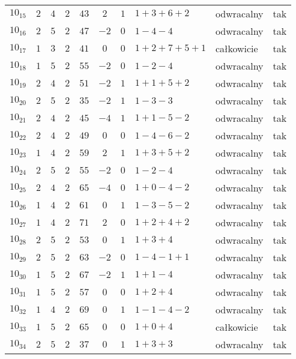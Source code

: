 \begin{longtable}{lccccccllc}
$10_{15}$  & $2$   & $4$ & $2$ & $43$  & $2$  & $1$ & $1+3+6+2$     & odwracalny & tak \\
$10_{16}$  & $2$   & $5$ & $2$ & $47$  & $-2$ & $0$ & $1-4-4$       & odwracalny & tak \\
$10_{17}$  & $1$   & $3$ & $2$ & $41$  & $0$  & $0$ & $1+2+7+5+1$   & całkowicie & tak \\
$10_{18}$  & $1$   & $5$ & $2$ & $55$  & $-2$ & $0$ & $1-2-4$       & odwracalny & tak \\
$10_{19}$  & $2$   & $4$ & $2$ & $51$  & $-2$ & $1$ & $1+1+5+2$     & odwracalny & tak \\
$10_{20}$  & $2$   & $5$ & $2$ & $35$  & $-2$ & $1$ & $1-3-3$       & odwracalny & tak \\
$10_{21}$  & $2$   & $4$ & $2$ & $45$  & $-4$ & $1$ & $1+1-5-2$     & odwracalny & tak \\
$10_{22}$  & $2$   & $4$ & $2$ & $49$  & $0$  & $0$ & $1-4-6-2$     & odwracalny & tak \\
$10_{23}$  & $1$   & $4$ & $2$ & $59$  & $2$  & $1$ & $1+3+5+2$     & odwracalny & tak \\
$10_{24}$  & $2$   & $5$ & $2$ & $55$  & $-2$ & $0$ & $1-2-4$       & odwracalny & tak \\
$10_{25}$  & $2$   & $4$ & $2$ & $65$  & $-4$ & $0$ & $1+0-4-2$     & odwracalny & tak \\
$10_{26}$  & $1$   & $4$ & $2$ & $61$  & $0$  & $1$ & $1-3-5-2$     & odwracalny & tak \\
$10_{27}$  & $1$   & $4$ & $2$ & $71$  & $2$  & $0$ & $1+2+4+2$     & odwracalny & tak \\
$10_{28}$  & $2$   & $5$ & $2$ & $53$  & $0$  & $1$ & $1+3+4$       & odwracalny & tak \\
$10_{29}$  & $2$   & $5$ & $2$ & $63$  & $-2$ & $0$ & $1-4-1+1$     & odwracalny & tak \\
$10_{30}$  & $1$   & $5$ & $2$ & $67$  & $-2$ & $1$ & $1+1-4$       & odwracalny & tak \\
$10_{31}$  & $1$   & $5$ & $2$ & $57$  & $0$  & $0$ & $1+2+4$       & odwracalny & tak \\
$10_{32}$  & $1$   & $4$ & $2$ & $69$  & $0$  & $1$ & $1-1-4-2$     & odwracalny & tak \\
$10_{33}$  & $1$   & $5$ & $2$ & $65$  & $0$  & $0$ & $1+0+4$       & całkowicie & tak \\
$10_{34}$  & $2$   & $5$ & $2$ & $37$  & $0$  & $1$ & $1+3+3$       & odwracalny & tak \\

\end{longtable}
